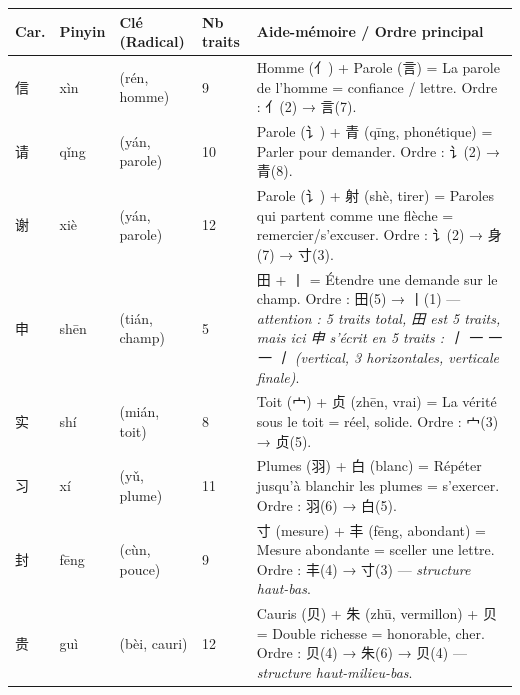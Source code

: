 \documentclass[11pt]{article}
\newcommand{\zh}[1]{\ifmmode\text{#1}\else{#1}\fi}
\begin{document}
\begin{propriete}
\begin{center}
\begin{tabularx}{\linewidth}{|X|X|X|X|X|}
\hline
\rowcolor{popgreenL} \textbf{Car.} & \textbf{Pinyin} & \textbf{Clé (Radical)} & \textbf{Nb traits} & \textbf{Aide-mémoire / Ordre principal} \\ \hline
信 & xìn & \zh{亻} (rén, homme) & 9 & Homme (亻) + Parole (言) = La parole de l'homme = confiance / lettre. Ordre : 亻(2) → 言(7). \\ \hline
请 & qǐng & \zh{讠} (yán, parole) & 10 & Parole (讠) + 青 (qīng, phonétique) = Parler pour demander. Ordre : 讠(2) → 青(8). \\ \hline
谢 & xiè & \zh{讠} (yán, parole) & 12 & Parole (讠) + 射 (shè, tirer) = Paroles qui partent comme une flèche = remercier/s'excuser. Ordre : 讠(2) → 身(7) → 寸(3). \\ \hline
申 & shēn & \zh{田} (tián, champ) & 5 & 田 + 丨 = Étendre une demande sur le champ. Ordre : 田(5) → 丨(1) — \emph{attention : 5 traits total, 田 est 5 traits, mais ici 申 s'écrit en 5 traits : 丨 一 一 一 丨 (vertical, 3 horizontales, verticale finale)}. \\ \hline
实 & shí & \zh{宀} (mián, toit) & 8 & Toit (宀) + 贞 (zhēn, vrai) = La vérité sous le toit = réel, solide. Ordre : 宀(3) → 贞(5). \\ \hline
习 & xí & \zh{羽} (yǔ, plume) & 11 & Plumes (羽) + 白 (blanc) = Répéter jusqu'à blanchir les plumes = s'exercer. Ordre : 羽(6) → 白(5). \\ \hline
封 & fēng & \zh{寸} (cùn, pouce) & 9 & 寸 (mesure) + 丰 (fēng, abondant) = Mesure abondante = sceller une lettre. Ordre : 丰(4) → 寸(3) — \emph{structure haut-bas}. \\ \hline
贵 & guì & \zh{贝} (bèi, cauri) & 12 & Cauris (贝) + 朱 (zhū, vermillon) + 贝 = Double richesse = honorable, cher. Ordre : 贝(4) → 朱(6) → 贝(4) — \emph{structure haut-milieu-bas}. \\ \hline
\end{tabularx}
\end{center}
\end{propriete}
\end{document}
